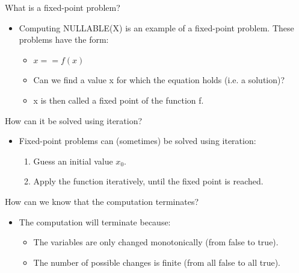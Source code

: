 \documentclass[11pt]{beamer}
\begin{document}
\begin{frame}
\begin{block}{What is a fixed-point problem?}
\begin{itemize}
\item Computing NULLABLE(X) is an example of a fixed-point problem. These problems have the form:
\begin{itemize}
\item $x == f(x)$
\item Can we find a value x for which the equation holds (i.e. a solution)?
\item x is then called a fixed point of the function f.

\end{itemize}

\end{itemize}
\end{block}

\begin{block}{How can it be solved using iteration?}
\begin{itemize}
\item Fixed-point problems can (sometimes) be solved using iteration:

\begin{enumerate}
\item Guess an initial value $x_0$.
\item Apply the function iteratively, until the fixed point is reached.
\end{enumerate}

\end{itemize}

\end{block}

\end{frame}

\begin{frame}

\begin{block}{How can we know that the computation terminates?}
\begin{itemize}
\item The computation will terminate because:
\begin{itemize}
\item The variables are only changed monotonically (from false to true).
\item The number of possible changes is finite (from all false to all true).
\end{itemize}

\end{itemize}
\end{block}

\end{frame}
\end{document}
